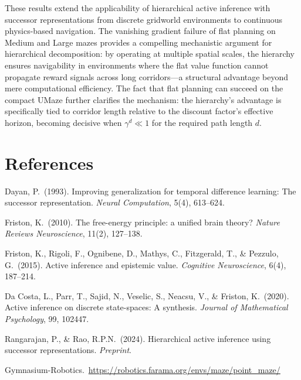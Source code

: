 \documentclass[11pt,a4paper]{article}
\begin{document}
These results extend the applicability of hierarchical active inference with successor representations from discrete gridworld environments to continuous physics-based navigation.
The vanishing gradient failure of flat planning on Medium and Large mazes provides a compelling mechanistic argument for hierarchical decomposition: by operating at multiple spatial scales, the hierarchy ensures navigability in environments where the flat value function cannot propagate reward signals across long corridors---a structural advantage beyond mere computational efficiency.
The fact that flat planning can succeed on the compact UMaze further clarifies the mechanism: the hierarchy's advantage is specifically tied to corridor length relative to the discount factor's effective horizon, becoming decisive when $\gamma^d \ll 1$ for the required path length $d$.

\section*{References}
\begin{enumerate}[label={[\arabic*]}, leftmargin=*, noitemsep]
    \item Dayan, P.\ (1993). Improving generalization for temporal difference learning: The successor representation. \textit{Neural Computation}, 5(4), 613--624.
    \item Friston, K.\ (2010). The free-energy principle: a unified brain theory? \textit{Nature Reviews Neuroscience}, 11(2), 127--138.
    \item Friston, K., Rigoli, F., Ognibene, D., Mathys, C., Fitzgerald, T., \& Pezzulo, G.\ (2015). Active inference and epistemic value. \textit{Cognitive Neuroscience}, 6(4), 187--214.
    \item Da Costa, L., Parr, T., Sajid, N., Veselic, S., Neacsu, V., \& Friston, K.\ (2020). Active inference on discrete state-spaces: A synthesis. \textit{Journal of Mathematical Psychology}, 99, 102447.
    \item Rangarajan, P., \& Rao, R.P.N.\ (2024). Hierarchical active inference using successor representations. \textit{Preprint}.
    \item Gymnasium-Robotics.\ \url{https://robotics.farama.org/envs/maze/point_maze/}
\end{enumerate}
\end{document}
